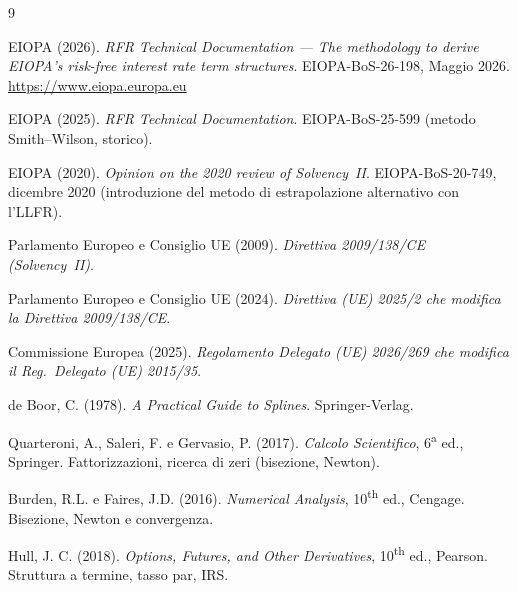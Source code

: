 \documentclass[11pt,a4paper]{article}
\theoremstyle{plain}
\theoremstyle{definition}
\theoremstyle{remark}
\begin{document}
\renewcommand{\refname}{Riferimenti bibliografici}
\begin{thebibliography}{9}

EIOPA (2026).
\textit{RFR Technical Documentation --- The methodology to derive EIOPA's risk-free
interest rate term structures}. EIOPA-BoS-26-198, Maggio 2026.
\url{https://www.eiopa.europa.eu}

EIOPA (2025).
\textit{RFR Technical Documentation}. EIOPA-BoS-25-599 (metodo Smith--Wilson, storico).

EIOPA (2020).
\textit{Opinion on the 2020 review of Solvency~II}. EIOPA-BoS-20-749, dicembre 2020
(introduzione del metodo di estrapolazione alternativo con l'LLFR).

Parlamento Europeo e Consiglio UE (2009).
\textit{Direttiva 2009/138/CE (Solvency~II)}.

Parlamento Europeo e Consiglio UE (2024).
\textit{Direttiva (UE) 2025/2 che modifica la Direttiva 2009/138/CE}.

Commissione Europea (2025).
\textit{Regolamento Delegato (UE) 2026/269 che modifica il Reg.\ Delegato (UE) 2015/35}.

de Boor, C. (1978).
\textit{A Practical Guide to Splines}. Springer-Verlag.

Quarteroni, A., Saleri, F. e Gervasio, P. (2017).
\textit{Calcolo Scientifico}, 6\textsuperscript{a} ed., Springer.
Fattorizzazioni, ricerca di zeri (bisezione, Newton).

Burden, R.L. e Faires, J.D. (2016).
\textit{Numerical Analysis}, 10\textsuperscript{th} ed., Cengage.
Bisezione, Newton e convergenza.

Hull, J. C. (2018).
\textit{Options, Futures, and Other Derivatives}, 10\textsuperscript{th} ed., Pearson.
Struttura a termine, tasso par, IRS.

\end{thebibliography}
\end{document}
